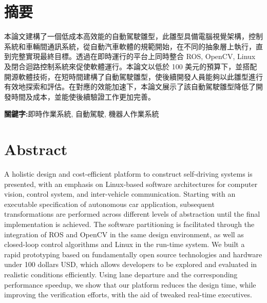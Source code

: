\begin{center}
\vspace{0.5cm}


\end{center}
\restoregeometry
\clearpage
{}


\setcounter{page}{1}
\newpage
{}
\chapter*{摘要}
\pagestyle{plain}

\begin{spacing}{2.0}

本論文建構了一個低成本高效能的自動駕駛雛型，此雛型具備電腦視覺架構，控制系統和車輛間通訊系統，從自動汽車軟體的規範開始，在不同的抽象層上執行，直到完整實現最終目標。透過在即時運行的平台上同時整合 ROS, OpenCV, Linux 及閉合迴路控制系統來促使軟體運行。本論文以低於 100 美元的預算下，並搭配開源軟體技術，在短時間建構了自動駕駛雛型，使後續開發人員能夠以此雛型進行有效地探索和評估。在對應的效能加速下，本論文展示了該自動駕駛雛型降低了開發時間及成本，並能使後續驗證工作更加完善。

\end{spacing}

\par{\noindent \bf 關鍵字:}{即時作業系統, 自動駕駛, 機器人作業系統}
\clearpage
{}

\newpage
{}
\chapter*{Abstract}
\pagestyle{plain}

\begin{spacing}{2.0}
	A holistic design and cost-efficient platform to construct self-driving systems is presented, with an emphasis on Linux-based software architectures for computer vision, control system, and inter-vehicle communication. Starting with an executable specification of autonomous car application, subsequent transformations are performed across different levels of abstraction until the final implementation is achieved. The software partitioning is facilitated through the integration of ROS and OpenCV in the same design environment, as well as closed-loop control algorithms and Linux in the run-time system. We built a rapid prototyping based on fundamentally open source technologies and hardware under 100 dollars USD, which allows developers to be explored and evaluated in realistic conditions efficiently. Using lane departure and the corresponding performance speedup, we show that our platform reduces the design time, while improving the verification efforts, with the aid of tweaked real-time executives.
\end{spacing}

